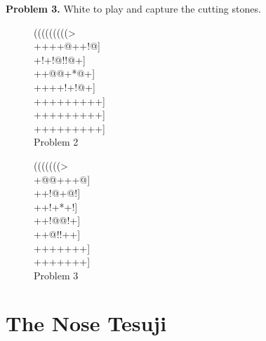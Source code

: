 \documentclass[royalvopaper,10pt,twoside,onecolumn,draft]{memoir}
\begin{document}
\noindent
\textbf{Problem 3.} White to play and capture the cutting stones.

\begin{figure}[ht]
    \begin{minipage}[c]{0.50\linewidth}
        \centering    
        {\gnos%
        (((((((((>\\
        ++++@++!@]\\
        +!+!@!!@+]\\
        ++@@+*@+]\\
        ++++!+!@+]\\
        +++++++++]\\
        +++++++++]\\
        +++++++++]\\
        }
        Problem 2
    \end{minipage}%
    \begin{minipage}[c]{0.50\linewidth}
        \centering    
        {\gnos%
        (((((((>\\
        +@@+++@]\\
        ++!@+@!]\\
        ++!+*+!]\\
        ++!@@!+]\\
        ++@!!++]\\
        +++++++]\\
        +++++++]\\
        }
        Problem 3
    \end{minipage}%
\end{figure}  

\section{The Nose Tesuji}
\end{document}
